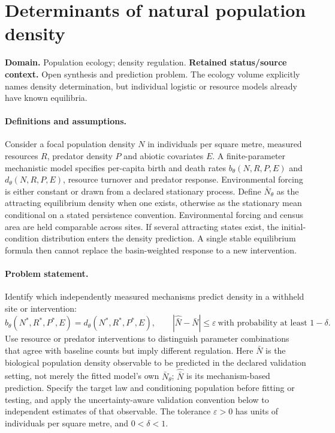 \documentclass[11pt]{article}
\begin{document}
\section*{Determinants of natural population density}
\label{prob:180}
\label{rank:165}
\par\smallskip

\noindent\textbf{Domain.} Population ecology; density regulation. \quad \textbf{Retained status/source context.} Open synthesis and prediction problem. The ecology volume explicitly names density determination, but individual logistic or resource models already have known equilibria.
\paragraph{Definitions and assumptions.} Consider a focal population density $N$ in individuals per square metre, measured resources $R$, predator density $P$ and abiotic covariates $E$. A finite-parameter mechanistic model specifies per-capita birth and death rates $b_\theta(N,R,P,E)$ and $d_\theta(N,R,P,E)$, resource turnover and predator response. Environmental forcing is either constant or drawn from a declared stationary process. Define $\bar N_\theta$ as the attracting equilibrium density when one exists, otherwise as the stationary mean conditional on a stated persistence convention. Environmental forcing and census area are held comparable across sites. If several attracting states exist, the initial-condition distribution enters the density prediction. A single stable equilibrium formula then cannot replace the basin-weighted response to a new intervention.
\paragraph{Problem statement.} Identify which independently measured mechanisms predict density in a withheld site or intervention:
\[
 b_\theta(N^*,R^*,P^*,E)=d_\theta(N^*,R^*,P^*,E),
 \qquad
 |\widehat{\bar N}-\bar N|\le\varepsilon
 \ \text{with probability at least }1-\delta.
\]
Use resource or predator interventions to distinguish parameter combinations that agree with baseline counts but imply different regulation. Here $\bar N$ is the biological population density observable to be predicted in the declared validation setting, not merely the fitted model's own $\bar N_\theta$; $\widehat{\bar N}$ is its mechanism-based prediction. Specify the target law and conditioning population before fitting or testing, and apply the uncertainty-aware validation convention below to independent estimates of that observable. The tolerance $\varepsilon>0$ has units of individuals per square metre, and $0<\delta<1$.
\end{document}
